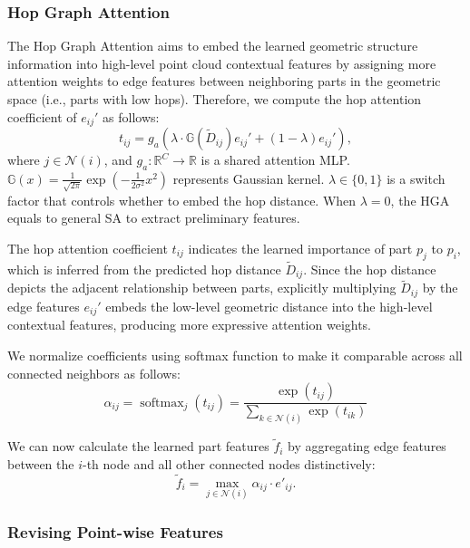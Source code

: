 \documentclass[letterpaper]{article} %
\begin{document}
\subsubsection{Hop Graph Attention}
The Hop Graph Attention aims to embed the learned geometric structure information into high-level point cloud contextual features by assigning more attention weights to edge features between neighboring parts in the geometric space (i.e., parts with low hops).
Therefore, we compute the hop attention coefficient of \(e_{i j}'\) as follows:
\begin{equation}
    t_{i j} = g_a\left( \lambda \cdot \mathbb{G}(\tilde{D}_{ij}) e_{ij}' + (1-\lambda)  e_{ij}' \right),
\end{equation}
where \(j \in \mathcal{N}(i)\), and \(g_a : \mathbb{R}^{C} \rightarrow \mathbb{R}\) is a shared attention MLP.  \(\mathbb{G}(x) = \frac{1}{\sqrt{2 \pi}} \exp \left(-\frac{1}{2 \sigma ^2} x^2\right)\) represents Gaussian kernel.
\(\lambda \in  \{0,1\}\) is a switch factor that controls whether to embed the hop distance. When \(\lambda=0\), the HGA equals to general SA to extract preliminary features.

The hop attention coefficient \(t_{i j}\) indicates the learned importance of part \(p_j\) to \(p_i\), which is inferred from the predicted hop distance \(\tilde{D}_{ij}\).
Since the hop distance depicts the adjacent relationship between parts, explicitly multiplying \(\tilde{D}_{ij}\) by the edge features \(e_{ij}'\) embeds the low-level geometric distance into the high-level contextual features, producing more expressive attention weights.

We normalize coefficients using softmax function to make it comparable across all connected neighbors as follows:
\begin{equation}
    \alpha_{i j}=\operatorname{softmax}_j\left(t_{i j}\right)=\frac{\exp \left(t_{i j}\right)}{\sum_{k \in \mathcal{N}(i)} \exp \left(t_{i k}\right)}
\end{equation}

We can now calculate the learned part features \(\tilde{f}_i\) by aggregating edge features between the \(i\)-th node and all other connected nodes distinctively:
\begin{equation}
\tilde{f}_i = \max  _{j \in \mathcal{N}(i)} \alpha_{ij} \cdot e'_{ij}.
\end{equation}

\subsubsection{Revising Point-wise Features}
\end{document}
